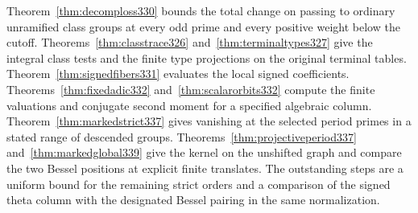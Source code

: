 \documentclass[a4paper,11pt]{article}
\theoremstyle{definition}
\theoremstyle{remark}
\numberwithin{equation}{section}
\begin{document}
Theorem~\ref{thm:decomploss330} bounds the total change on passing to ordinary unramified class groups at every odd prime and every positive weight below the cutoff. Theorems~\ref{thm:classtrace326} and~\ref{thm:terminaltypes327} give the integral class tests and the finite type projections on the original terminal tables. Theorem~\ref{thm:signedfibers331} evaluates the local signed coefficients. Theorems~\ref{thm:fixedadic332} and~\ref{thm:scalarorbits332} compute the finite valuations and conjugate second moment for a specified algebraic column.
Theorem~\ref{thm:markedstrict337} gives vanishing at the selected period primes in a stated range of descended groups. Theorems~\ref{thm:projectiveperiod337} and~\ref{thm:markedglobal339} give the kernel on the unshifted graph and compare the two Bessel positions at explicit finite translates. The outstanding steps are a uniform bound for the remaining strict orders and a comparison of the signed theta column with the designated Bessel pairing in the same normalization.

\par\medskip
\clearpage
\end{document}
